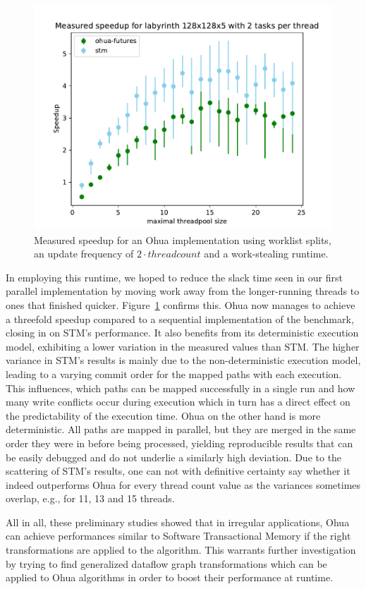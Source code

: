 \begin{figure}[b]
    \centering
    \includegraphics[width=.5\textwidth,keepaspectratio]{gfx/preliminaries-labyrinth/current-128x128x5}
    \caption{Measured speedup for an Ohua implementation using worklist splits, an update frequency of $2 \cdot threadcount$ and a work-stealing runtime.}%
    \label{fig:preliminaries:future-results}
\end{figure}

In employing this runtime, we hoped to reduce the slack time seen in our first parallel implementation by moving work away from the longer-running threads to ones that finished quicker.
Figure~\ref{fig:preliminaries:future-results} confirms this.
Ohua now manages to achieve a threefold speedup compared to a sequential implementation of the benchmark, closing in on STM's performance.
It also benefits from its deterministic execution model, exhibiting a lower variation in the measured values than STM.
The higher variance in STM's results is mainly due to the non-deterministic execution model, leading to a varying commit order for the mapped paths with each execution.
This influences, which paths can be mapped successfully in a single run and how many write conflicts occur during execution which in turn has a direct effect on the predictability of the execution time.
Ohua on the other hand is more deterministic.
All paths are mapped in parallel, but they are merged in the same order they were in before being processed, yielding reproducible results that can be easily debugged and do not underlie a similarly high deviation.
Due to the scattering of STM's results, one can not with definitive certainty say whether it indeed outperforms Ohua for every thread count value as the variances sometimes overlap, e.g., for 11, 13 and 15 threads.

All in all, these preliminary studies showed that in irregular applications, Ohua can achieve performances similar to Software Transactional Memory if the right transformations are applied to the algorithm.
This warrants further investigation by trying to find generalized dataflow graph transformations which can be applied to Ohua algorithms in order to boost their performance at runtime.

